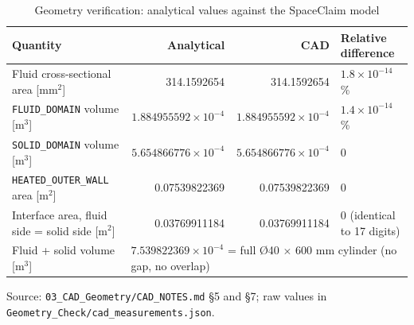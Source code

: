 \begin{table}[htbp]
\centering
\footnotesize
\caption{Geometry verification: analytical values against the SpaceClaim model}
\label{tab:geomver}
\begin{tabular}{lrrl}
\toprule
Quantity & Analytical & CAD & Relative difference \\
\midrule
Fluid cross-sectional area [mm$^2$] & 314.1592654 & 314.1592654 & $1.8\times10^{-14}$\,\% \\
\texttt{FLUID\_DOMAIN} volume [m$^3$] & $1.884955592\times10^{-4}$ & $1.884955592\times10^{-4}$ & $1.4\times10^{-14}$\,\% \\
\texttt{SOLID\_DOMAIN} volume [m$^3$] & $5.654866776\times10^{-4}$ & $5.654866776\times10^{-4}$ & 0 \\
\texttt{HEATED\_OUTER\_WALL} area [m$^2$] & 0.07539822369 & 0.07539822369 & 0 \\
Interface area, fluid side = solid side [m$^2$] & 0.03769911184 & 0.03769911184 & 0 (identical to 17 digits) \\
Fluid + solid volume [m$^3$] & \multicolumn{3}{l}{$7.539822369\times10^{-4}$ = full \O{}40 $\times$ 600 mm cylinder (no gap, no overlap)} \\
\bottomrule
\end{tabular}
\par\smallskip\parbox{\linewidth}{\footnotesize\raggedright Source: \texttt{03\_CAD\_Geometry/CAD\_NOTES.md} \S5 and \S7; raw values in \texttt{Geometry\_Check/cad\_measurements.json}.}
\end{table}
